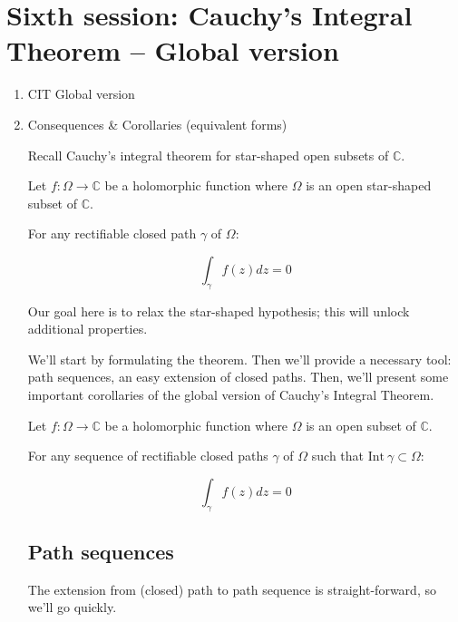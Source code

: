 \section{Sixth session: Cauchy's Integral Theorem  -- Global version}

\begin{enumerate}
    \item CIT Global version
    \item Consequences \& Corollaries (equivalent forms)

Recall Cauchy's integral theorem for star-shaped open subsets of $\mathbb{C}$.

\begin{thm*}
    Let $f: \Omega \rightarrow \mathbb{C}$ be a holomorphic function where $\Omega$ is an open star-shaped subset of $\mathbb{C}$.

    For any rectifiable closed path $\gamma$ of $\Omega$:

    $$ \int_\gamma f(z)dz = 0 $$
\end{thm*}

Our goal here is to relax the star-shaped hypothesis; this will unlock additional properties.

We'll start by formulating the theorem. Then we'll provide a necessary tool: path sequences, an easy extension of closed paths. Then, we'll present some important corollaries of the global version of Cauchy's Integral Theorem.


\begin{thm*}
    Let $f: \Omega \rightarrow \mathbb{C}$ be a holomorphic function where $\Omega$ is an open subset of $\mathbb{C}$.

    For any sequence of rectifiable closed paths $\gamma$ of $\Omega$ such that $\mathrm{Int}~\gamma \subset \Omega$:

    $$ \int_\gamma f(z)dz = 0 $$
\end{thm*}

\subsection*{Path sequences}
The extension from (closed) path to path sequence is straight-forward, so we'll go quickly. 


\end{enumerate}
